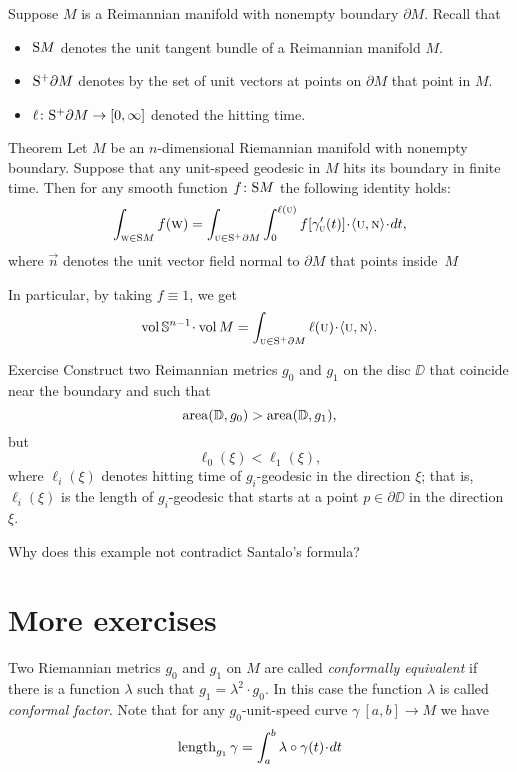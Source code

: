 Suppose $M$ is a Reimannian manifold with nonempty boundary $\partial M$.
Recall that 
\begin{itemize}
\item $\S M$ denotes the unit tangent bundle of a Reimannian manifold $M$.
\item $\S^+ \partial M$ denotes by the set of unit vectors at points on $\partial M$ that point in $M$.
\item $\ell\:\S^+ \partial M\to [0,\infty]$ denoted the hitting time.
\end{itemize}

\begin{thm}{Theorem}
Let $M$ be an $n$-dimensional Riemannian manifold with nonempty boundary.
Suppose that any unit-speed geodesic in $M$ hits its boundary in finite time.
Then for any smooth function $f\:\S M$ the following identity holds:
\[\int_{\vec w\in \S M}f(\vec w)
=
\int_{\vec u\in \S^+ \partial M} 
\int_0^{\ell(\vec u)} f[\gamma'_{\vec u}(t)]\cdot\langle\vec u,\vec n\rangle\cdot dt,\]
where $\vec n$ denotes the unit vector field normal to $\partial M$ that points inside~$M$

In particular, by taking $f\equiv 1$, we get
\[\vol\SSS^{n-1}\cdot\vol M=\int_{\vec u\in \S^+ \partial M} \ell(\vec u)\cdot\langle\vec u,\vec n\rangle.\]

\end{thm}

\begin{thm}{Exercise}
Construct two Reimannian metrics $g_0$ and $g_1$ on the disc $\DD$ that coincide near the boundary and such that 
\[\area (\DD,g_0)>\area (\DD,g_1),\]
but 
\[\ell_0(\xi)<\ell_1(\xi),\]
where $\ell_i(\xi)$ denotes hitting time of $g_i$-geodesic in the direction $\xi$;
that is, 
$\ell_i(\xi)$ is the length of $g_i$-geodesic that starts at a point $p\in \partial \DD$ in the direction $\xi$.

Why does this example  not contradict Santalo's formula?
\end{thm}

\section{More exercises}

Two Riemannian metrics $g_0$ and $g_1$ on $M$ are called \emph{conformally equivalent} if there is a function $\lambda$ such that $g_1=\lambda^2\cdot g_0$.
In this case the function $\lambda$ is called \emph{conformal factor}.
Note that for any $g_0$-unit-speed curve $\gamma\:[a,b]\to M$ 
we have
\[\length_{g_1}\gamma=\int_a^b\lambda\circ\gamma(t)\cdot dt\]

